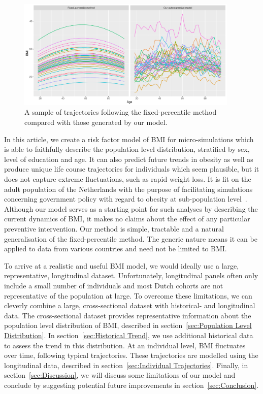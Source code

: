 \documentclass{imammb}
\numberwithin{equation}{section}
\begin{document}
\vspace{-4mm}

\begin{figure}[!h]
\centering
\includegraphics[width=0.94\textwidth] {"Figures/Individual Trajectories.pdf"}
\caption{A sample of trajectories following the fixed-percentile method compared with those generated by our model.}
\label{fig:Individual Trajectories}
\vspace*{-9pt}
\end{figure}

\vspace{2mm}

In this article, we create a risk factor model of BMI for micro-simulations which is able to faithfully describe the population level distribution, stratified by sex, level of education and age. It can also predict future trends in obesity as well as produce unique life course trajectories for individuals which seem plausible, but it does not capture extreme fluctuations, such as rapid weight loss. It is fit on the adult population of the Netherlands with the purpose of facilitating simulations concerning government policy with regard to obesity at sub-population level~\citep{TenDam2023}. Although our model serves as a starting point for such analyses by describing the current dynamics of BMI, it makes no claims about the effect of any particular preventive intervention. Our method is simple, tractable and a natural generalisation of the fixed-percentile method. The generic nature means it can be applied to data from various countries and need not be limited to BMI.

To arrive at a realistic and useful BMI model, we would ideally use a large, representative, longitudinal dataset. Unfortunately, longitudinal panels often only include a small number of individuals and most Dutch cohorts are not representative of the population at large. To overcome these limitations, we can cleverly combine a large, cross-sectional dataset with historical- and longitudinal data. The cross-sectional dataset provides representative information about the population level distribution of BMI, described in section~\ref{sec:Population Level Distribution}. In section~\ref{sec:Historical Trend}, we use additional historical data to assess the trend in this distribution. At an individual level, BMI fluctuates over time, following typical trajectories. These trajectories are modelled using the longitudinal data, described in section~\ref{sec:Individual Trajectories}. Finally, in section~\ref{sec:Discussion}, we will discuss some limitations of our model and conclude by suggesting potential future improvements in section~\ref{sec:Conclusion}.
\end{document}
